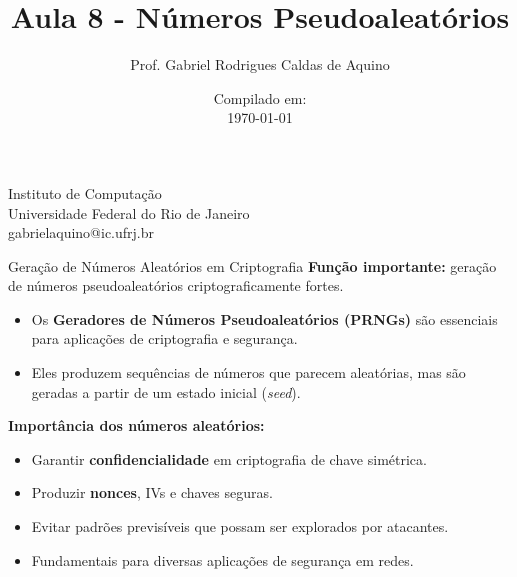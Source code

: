\title{Aula 8 - Números Pseudoaleatórios}

\author{Prof. Gabriel Rodrigues Caldas de Aquino}

\institute
{
    Instituto de Computação \\
    Universidade Federal do Rio de Janeiro\\
    gabrielaquino@ic.ufrj.br%
}
\date{Compilado em: \\ \today} %




\begin{frame}
    \titlepage
\end{frame}

\begin{frame}{Geração de Números Aleatórios em Criptografia}
    \textbf{Função importante:} geração de números pseudoaleatórios criptograficamente fortes.

    \medskip
    \begin{itemize}
        \item Os \textbf{Geradores de Números Pseudoaleatórios (PRNGs)} são essenciais para aplicações de criptografia e segurança.
        \item Eles produzem sequências de números que parecem aleatórias, mas são geradas a partir de um estado inicial (\textit{seed}).
    \end{itemize}

    \medskip
    \textbf{Importância dos números aleatórios:}
    \begin{itemize}
        \item Garantir \textbf{confidencialidade} em criptografia de chave simétrica.
        \item Produzir \textbf{nonces}, IVs e chaves seguras.
        \item Evitar padrões previsíveis que possam ser explorados por atacantes.
        \item Fundamentais para diversas aplicações de segurança em redes.
    \end{itemize}
\end{frame}

